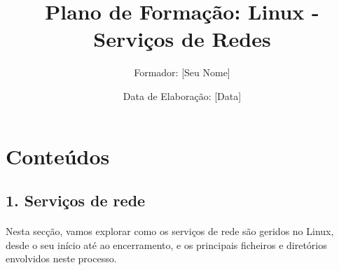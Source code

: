 \documentclass[10pt,a4paper]{article}
\title{Plano de Formação: Linux - Serviços de Redes}
\author{Formador: [Seu Nome]}
\date{Data de Elaboração: [Data]}
\begin{document}
	
	\section*{Conteúdos}
	
	\subsection*{1. Serviços de rede}
	\vspace{-1.2em}
	\paragraph{}
	Nesta secção, vamos explorar como os serviços de rede são geridos no Linux, desde o seu início até ao encerramento, e os principais ficheiros e diretórios envolvidos neste processo.
	
\end{document}
